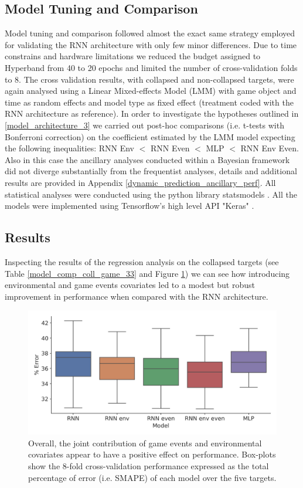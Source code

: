 \subsection{Model Tuning and Comparison}
\label{tuning_comparison_3}
Model tuning and comparison followed almost the exact same strategy employed for validating the RNN architecture with only few minor differences. Due to time constrains and hardware limitations we reduced the budget assigned to Hyperband from 40 to 20 epochs and limited the number of cross-validation folds to 8. The cross validation results, with collapsed and non-collapsed targets, were again analysed using a Linear Mixed-effects Model (LMM) with game object and time as random effects and model type as fixed effect (treatment coded with the RNN architecture as reference). In order to investigate the hypotheses outlined in \ref{model_architecture_3} we carried out post-hoc comparisons (i.e. t-tests with Bonferroni correction) on the coefficient estimated by the LMM model expecting the following inequalities: RNN Env $<$ RNN Even $<$ MLP $<$ RNN Env Even. Also in this case the ancillary analyses conducted within a Bayesian framework did not diverge substantially from the frequentist analyses, details and additional results are provided in Appendix \ref{dynamic_prediction_ancillary_perf}. All statistical analyses were conducted using the python library statsmodels \cite{seabold2010statsmodels}.  All the models were implemented using Tensorflow's high level API "Keras" \cite{tensorflow2015-whitepaper,chollet2015keras}. 

\subsection{Results}
\label{results_3}
Inspecting the results of the regression analysis on the collapsed targets (see Table \ref{model_comp_coll_game_33} and Figure \ref{model_comp_coll_33}) we can see how introducing environmental and game events covariates led to a modest but robust improvement in performance when compared with the RNN architecture. 

\begin{figure}[h]
\centering
\includegraphics[width=.5\columnwidth]{images/chapter_3/performance_collapsed_33.png}
\caption[\textbf{Aggregated comparison of model performance}]{ Overall, the joint contribution of game events and environmental covariates appear to have a positive effect on performance. Box-plots show the 8-fold cross-validation performance expressed as the total percentage of error (i.e. SMAPE) of each model over the five targets.}
\label{model_comp_coll_33} 
\end{figure}

